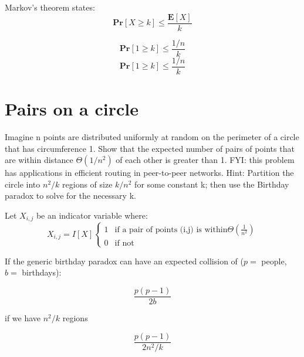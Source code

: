 \documentclass[titlepage]{article}\usepackage[]{graphicx}\usepackage[]{color}
\begin{document}
Markov's theorem states:
\[ \mathbf{Pr} \left[ X \geq k \right] \leq \frac{\mathbf E[X]}{k} \]

\[ \mathbf{Pr} \left[ 1 \geq k \right] \leq \frac{1/n}{k} \]
\[ \mathbf{Pr} \left[ 1 \geq k \right] \leq \frac{1/n}{k} \]





  \section{ Pairs on a circle}
Imagine n points are distributed uniformly at random on the perimeter of a
circle that has circumference 1. Show that the expected number of pairs of
points that are within distance $\Theta(1/n^2)$ of each other is greater than 1. FYI:
this problem has applications in efficient routing in peer-to-peer networks.
Hint: Partition the circle into $n^2/k$ regions of size $k/n^2$ for some constant
k; then use the Birthday paradox to solve for the necessary k.

Let $X_{i,j}$ be an indicator variable where:
\[
	X_{i,j} = I[X]
  \begin{cases}
	  1 & \text{if a pair of points (i,j) is within} \Theta(\frac{1}{n^2}) \\
	   0       & \text{if not } 
  \end{cases}
\]

If the generic birthday paradox can have an expected collision of ($p=$ people,
$b = $ birthdays):

\[ \frac{p(p-1)}{2b} \]

if we have $n^2/k$ regions 

\[ \frac{p(p-1)}{2n^2/k} \]



  
\end{document}
